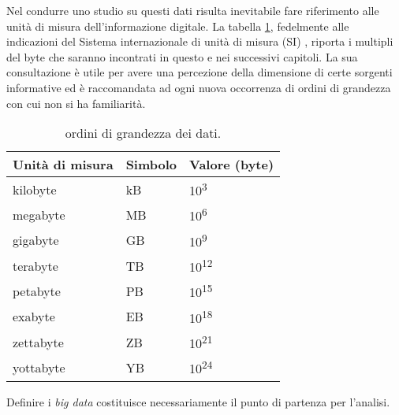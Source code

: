 Nel condurre uno studio su questi dati risulta inevitabile fare riferimento alle unità di misura dell’informazione digitale. La tabella \ref{table:units}, fedelmente alle indicazioni 
del Sistema internazionale di unità di misura (SI) \cite{bipm}, riporta i multipli del byte che 
saranno incontrati in questo e nei successivi capitoli. La sua consultazione è utile per avere una percezione della dimensione di certe sorgenti informative ed è 
raccomandata ad ogni nuova occorrenza di ordini di grandezza con cui non si ha familiarità.

\begin{table}[ht]
\centering
\begin{tabular}{@{}|l|l|l|@{}}
\toprule
Unità di misura & Simbolo & Valore (byte) \\ \midrule
kilobyte        & kB      & 10\textsuperscript{3}           \\
megabyte        & MB      & 10\textsuperscript{6}           \\
gigabyte        & GB      & 10\textsuperscript{9}           \\
terabyte        & TB      & 10\textsuperscript{12}          \\
petabyte        & PB      & 10\textsuperscript{15}          \\
exabyte         & EB      & 10\textsuperscript{18}          \\
zettabyte       & ZB      & 10\textsuperscript{21}          \\
yottabyte       & YB      & 10\textsuperscript{24}          \\ \bottomrule
\end{tabular}
\caption{ordini di grandezza dei dati.}
\label{table:units}
\end{table}

Definire i \textit{big data} costituisce necessariamente il punto di partenza per l’analisi.

